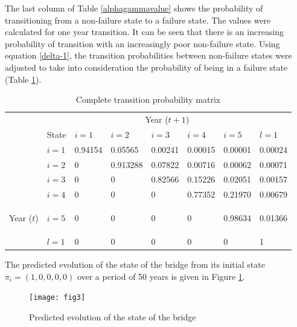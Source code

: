 \documentclass[]{article}
\begin{document}
The last column of Table \ref{alphagammavalue} shows the probability
of transitioning from a non-failure state to a failure state. The
values were calculated for one year transition. It can be seen that
there is an increasing probability of transition with an increasingly
poor non-failure state. Using equation \ref{delta-1}, the transition
probabilities between non-failure states were adjusted to take into
consideration the probability of being in a failure state (Table \ref{totalmatrix}).
\begin{table}[H]
\caption{Complete transition probability matrix}
\begin{centering}
\begin{tabular}{l|l|lllll|l}
\hline 
\multicolumn{1}{l}{} & \multicolumn{7}{c}{Year ($t+1$)}\tabularnewline
\cline{2-8} 
\multicolumn{1}{l|}{} & State  & $i=1$  & $i=2$  & $i=3$  & $i=4$  & $i=5$  & $l=1$ \tabularnewline
\hline 
 & $i=1$  & 0.94154  & 0.05565  & 0.00241  & 0.00015  & 0.00001  & 0.00024 \tabularnewline
 & $i=2$  & 0  & 0.913288  & 0.07822  & 0.00716  & 0.00062  & 0.00071 \tabularnewline
 & $i=3$  & 0  & 0  & 0.82566  & 0.15226  & 0.02051  & 0.00157 \tabularnewline
 & $i=4$  & 0  & 0  & 0  & 0.77352  & 0.21970  & 0.00679 \tabularnewline
\begin{rotate}{90} Year ($t$) \end{rotate}  & $i=5$  & 0  & 0  & 0  & 0  & 0.98634  & 0.01366 \tabularnewline
\hline 
 & $l=1$  & 0  & 0  & 0  & 0  & 0  & 1 \tabularnewline
\hline 
\end{tabular}
\par\end{centering}
\label{totalmatrix} 
\end{table}


The predicted evolution of the state of the bridge from its initial
state $\pi_{i}=(1,0,0,0,0)$ over a period of 50 years is given in
Figure \ref{csevolution}.
\begin{figure}[H]
\centering{}\texttt{[image: fig3]} \caption{Predicted evolution of the state of the bridge }
\label{csevolution} 
\end{figure}
\end{document}
